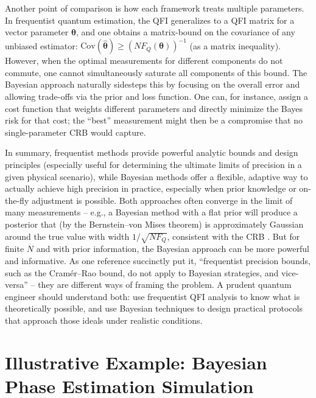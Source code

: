 Another point of comparison is how each framework treats multiple
parameters. In frequentist quantum estimation, the QFI generalizes to
a QFI matrix for a vector parameter $\boldsymbol{\theta}$, and one
obtains a matrix-bound on the covariance of any unbiased estimator:
$\mathrm{Cov}(\hat{\boldsymbol{\theta}}) \ge (N
F_Q(\boldsymbol{\theta}))^{-1}$ (as a matrix inequality). However,
when the optimal measurements for different components do not commute,
one cannot simultaneously saturate all components of this bound. The
Bayesian approach naturally sidesteps this by focusing on the overall
error and allowing trade-offs via the prior and loss function. One
can, for instance, assign a cost function that weights different
parameters and directly minimize the Bayes risk for that cost; the
“best” measurement might then be a compromise that no single-parameter
CRB would capture.



In summary, frequentist methods provide powerful analytic bounds and
design principles (especially useful for determining the ultimate
limits of precision in a given physical scenario), while Bayesian
methods offer a flexible, adaptive way to actually achieve high
precision in practice, especially when prior knowledge or on-the-fly
adjustment is possible. Both approaches often converge in the limit of
many measurements – e.g., a Bayesian method with a flat prior will
produce a posterior that (by the Bernstein–von Mises theorem) is
approximately Gaussian around the true value with width $1/\sqrt{N
  F_Q}$, consistent with the CRB . But for finite $N$ and with prior
information, the Bayesian approach can be more powerful and
informative. As one reference succinctly put it, “frequentist
precision bounds, such as the Cramér–Rao bound, do not apply to
Bayesian strategies, and vice-versa” – they are different ways of
framing the problem. A prudent quantum engineer should understand
both: use frequentist QFI analysis to know what is theoretically
possible, and use Bayesian techniques to design practical protocols
that approach those ideals under realistic conditions.



\section{Illustrative Example: Bayesian Phase Estimation Simulation}

